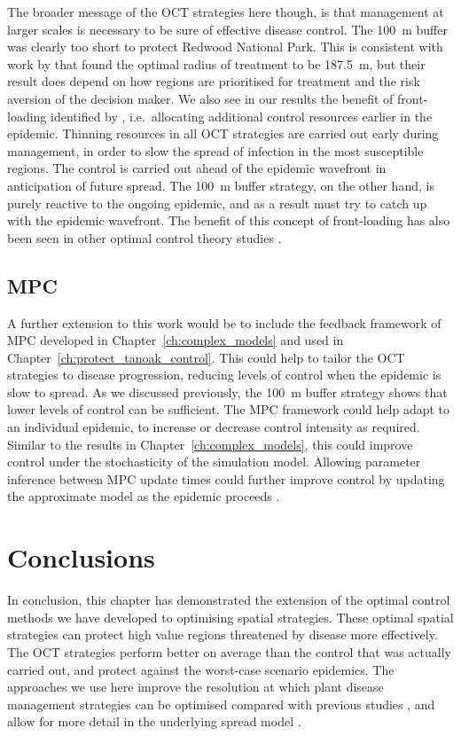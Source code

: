 The broader message of the OCT strategies here though, is that management at larger scales is necessary to be sure of effective disease control. The \SI{100}{\meter} buffer was clearly too short to protect Redwood National Park. This is consistent with work by \citet{cunniffe_modelling_2016} that found the optimal radius of treatment to be \SI{187.5}{\meter}, but their result does depend on how regions are prioritised for treatment and the risk aversion of the decision maker. We also see in our results the benefit of front-loading identified by \citet{cunniffe_modelling_2016}, i.e.\ allocating additional control resources earlier in the epidemic. Thinning resources in all OCT strategies are carried out early during management, in order to slow the spread of infection in the most susceptible regions. The control is carried out ahead of the epidemic wavefront in anticipation of future spread. The \SI{100}{\meter} buffer strategy, on the other hand, is purely reactive to the ongoing epidemic, and as a result must try to catch up with the epidemic wavefront. The benefit of this concept of front-loading has also been seen in other optimal control theory studies \citep{behncke_optimal_2000}.

\subsection{MPC}

A further extension to this work would be to include the feedback framework of MPC developed in Chapter~\ref{ch:complex_models} and used in Chapter~\ref{ch:protect_tanoak_control}. This could help to tailor the OCT strategies to disease progression, reducing levels of control when the epidemic is slow to spread. As we discussed previously, the \SI{100}{\meter} buffer strategy shows that lower levels of control can be sufficient. The MPC framework could help adapt to an individual epidemic, to increase or decrease control intensity as required. Similar to the results in Chapter~\ref{ch:complex_models}, this could improve control under the stochasticity of the simulation model. Allowing parameter inference between MPC update times could further improve control by updating the approximate model as the epidemic proceeds \citep{thompson_control_2018}.

\section{Conclusions}

In conclusion, this chapter has demonstrated the extension of the optimal control methods we have developed to optimising spatial strategies. These optimal spatial strategies can protect high value regions threatened by disease more effectively. The OCT strategies perform better on average than the control that was actually carried out, and protect against the worst-case scenario epidemics. The approaches we use here improve the resolution at which plant disease management strategies can be optimised compared with previous studies \citep[c.f.][]{forster_optimizing_2007}, and allow for more detail in the underlying spread model \citep[c.f.][]{epanchin_optimal_2012}.